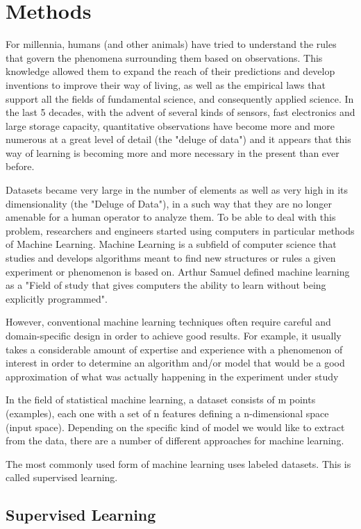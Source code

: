 
\section{Methods}
For millennia, humans (and other animals) have tried to understand the rules that govern the phenomena surrounding them based on observations. This knowledge allowed them to expand the reach of their predictions and develop inventions to improve their way of living, as well as the empirical laws that support all the fields of fundamental science, and consequently applied science. In the last 5 decades, with the advent of several kinds of sensors, fast electronics and large storage capacity, quantitative observations have become more and more numerous at a great level of detail (the "deluge of data") and it appears that this way of learning is becoming more and more necessary in the present than ever before.

Datasets became very large in the number of elements as well as very high in its dimensionality (the "Deluge of Data"), in a such way that they are no longer amenable for a human operator to analyze them. To be able to deal with this problem, researchers and engineers started using computers in particular methods of Machine Learning. Machine Learning is a subfield of computer science that studies and develops algorithms meant to find new structures or rules a given experiment or phenomenon is based on. Arthur Samuel defined machine learning as a "Field of study that gives computers the ability to learn without being explicitly programmed".

However, conventional machine learning techniques often require careful and domain-specific design in order to achieve good results. For example, it usually takes a considerable amount of expertise and experience with a phenomenon of interest in order to determine an algorithm and/or model that would be a good approximation of what was actually happening in the experiment under study

In the field of statistical machine learning, a dataset consists of m points (examples), each one with a set of n features defining a n-dimensional space (input space). Depending on the specific kind of model we would like to extract from the data, there are a number of different approaches for machine learning.

The most commonly used form of machine learning uses labeled datasets. This is called supervised learning.

\subsection{Supervised Learning}
\label{subsec:supervised-learning}

